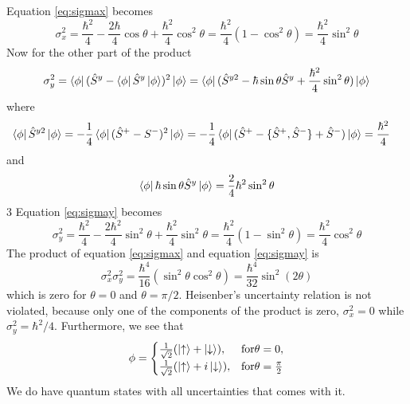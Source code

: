 \documentclass{article}
\begin{document}
Equation \ref{eq:sigmax} becomes
\begin{equation}
\sigma_x^2=\frac{\hbar^2}{4}-\frac{2\hbar}{4}\cos\theta+\frac{\hbar^2}{4}\cos^2\theta =
\frac{\hbar^2}{4}(1-\cos^2\theta)=\frac{\hbar^2}{4}\sin^2\theta
\end{equation}
Now for the other part of the product
\begin{equation}
\label{eq:sigmay}
\sigma_y^2=\bra{\phi}(\hat{S}^y-\bra{\phi}\hat{S}^y\ket{\phi})^2\ket{\phi} =
\bra{\phi}(\hat{S}^{y2}-\hbar\sin\theta\hat{S}^y+\frac{\hbar^2}{4}\sin^2\theta)\ket{\phi}
\end{equation}
where
\begin{align*}
\bra{\phi}\hat{S}^{y2}\ket{\phi} &= -\frac{1}{4}\bra{\phi}(\hat{S}^+ - S^-)^2\ket{\phi}
=-\frac{1}{4}\bra{\phi}(\hat{S}^+-\{\hat{S}^+,\hat{S}^-\}+\hat{S}^-)\ket{\phi} = \frac{\hbar^2}{4}
\end{align*}
and
\begin{equation*}
\bra{\phi}\hbar\sin\theta\hat{S}^y\ket{\phi} = \frac{2}{4}\hbar^2\sin^2\theta
\end{equation*}3
Equation \ref{eq:sigmay} becomes
\begin{equation}
\sigma_y^2 = \frac{\hbar^2}{4}-\frac{2\hbar^2}{4}\sin^2\theta+\frac{\hbar^2}{4}\sin^2\theta =
\frac{\hbar^2}{4}(1-\sin^2\theta)=\frac{\hbar^2}{4}\cos^2\theta
\end{equation}
The product of equation \ref{eq:sigmax} and equation \ref{eq:sigmay} is
\begin{equation}
\sigma_x^2\sigma_y^2=\frac{\hbar^4}{16}(\sin^2\theta\cos^2\theta)=\frac{\hbar^4}{32}\sin^2{(2\theta)}
\end{equation}
which is zero for $\theta=0$ and $\theta=\pi/2$. Heisenber's uncertainty relation is not violated, because only one of the components of the product is zero, $\sigma_x^2=0$ while $\sigma_y^2=\hbar^2/4$. Furthermore, we see that
\begin{equation}
\phi=
\begin{cases}
\frac{1}{\sqrt{2}}(\ket{\uparrow} + \ket{\downarrow}), &\text{for} \theta = 0, \\
\frac{1}{\sqrt{2}}(\ket{\uparrow} + i\ket{\downarrow}), &\text{for} \theta = \frac{\pi}{2}
\end{cases}
\end{equation}
We do have quantum states with all uncertainties that comes with it.

\end{document}
